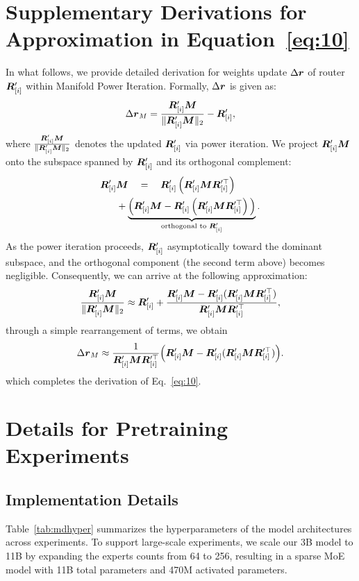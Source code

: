 \documentclass[11pt]{article}
\newcommand{\Name}{Manifold Power Iteration}
\begin{document}


\clearpage
\newpage

\appendix

\section{Supplementary Derivations for Approximation in Equation~\ref{eq:10}}
\label{apx:math}
In what follows, we provide detailed derivation for weights update $\Delta {\bm{r}}$ of router ${\bm{R}}_{[i]}^\prime$ within \Name.
Formally, $\Delta {\bm{r}}$ is given as:
\[
    {\Delta {\bm{r}}}_{M} = \frac{{\bm{R}}_{[i]}^\prime{\bm{M}}}{\|{\bm{R}}_{[i]}^\prime{\bm{M}}\|_2} -  {\bm{R}}_{[i]}^\prime,
\]
where $\frac{{\bm{R}}_{[i]}^\prime{\bm{M}}}{\|{\bm{R}}_{[i]}^\prime{\bm{M}}\|_2}$ denotes the updated ${\bm{R}}_{[i]}^\prime$ via power iteration.
We project ${\bm{R}}_{[i]}^\prime {\bm{M}}$ onto the subspace spanned by ${\bm{R}}_{[i]}^\prime$ and its orthogonal complement:
\[
\begin{split}
    {\bm{R}}_{[i]}^\prime &{} {\bm{M}} \quad = \quad {\bm{R}}_{[i]}^\prime \left({\bm{R}}_{[i]}^\prime {\bm{M}}{\bm{R}}_{[i]}^{\prime\top}\right) \\
   & + \underbrace{\Big({\bm{R}}_{[i]}^\prime{\bm{M}} - {\bm{R}}_{[i]}^\prime \left({\bm{R}}_{[i]}^\prime {\bm{M}}{\bm{R}}_{[i]}^{\prime\top}\right)\Big)}_{\text{orthogonal to } {\bm{R}}_{[i]}^\prime}.
\end{split}
\]
As the power iteration proceeds, ${\bm{R}}_{[i]}^\prime$ asymptotically toward the dominant subspace, and the orthogonal component (the second term above) becomes negligible. Consequently, we can arrive at the following approximation:
\[
    \frac{{\bm{R}}_{[i]}^\prime{\bm{M}}}{\|{\bm{R}}_{[i]}^\prime{\bm{M}}\|_2} \approx {\bm{R}}_{[i]}^\prime + \frac{{\bm{R}}_{[i]}^\prime {\bm{M}} - {\bm{R}}_{[i]}^\prime({\bm{R}}_{[i]}^\prime {\bm{M}} {\bm{R}}_{[i]}^{\prime\top}) }{{\bm{R}}_{[i]}^\prime {\bm{M}} {\bm{R}}_{[i]}^{\prime\top}},
\]
through a simple rearrangement of terms, we obtain
\[
    {\Delta {\bm{r}}}_{M} \approx \frac{1}{{\bm{R}}_{[i]}^\prime {\bm{M}} {\bm{R}}_{[i]}^{\prime\top}} {\left( {\bm{R}}_{[i]}^\prime {\bm{M}} - {\bm{R}}_{[i]}^\prime({\bm{R}}_{[i]}^\prime {\bm{M}} {\bm{R}}_{[i]}^{\prime\top}) \right)}. 
\]
which completes the derivation of Eq.~\ref{eq:10}.

\section{Details for Pretraining Experiments}
\label{apx:details}
\subsection{Implementation Details}
Table~\ref{tab:mdhyper} summarizes the hyperparameters of the model architectures across experiments. 
To support large-scale experiments, we scale our 3B model to 11B by expanding the experts counts from 64 to 256, resulting in a sparse MoE model with 11B total parameters and 470M activated parameters.
\end{document}
